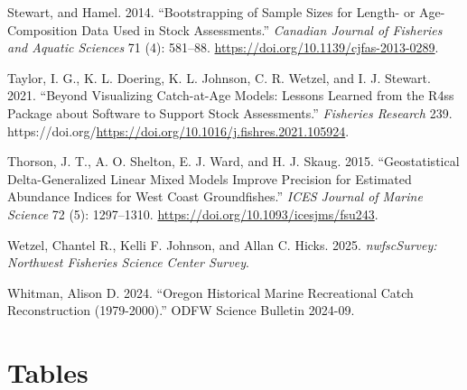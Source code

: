 \documentclass[
]{scrartcl}
\newlength{\cslhangindent}
\newenvironment{CSLReferences}[2] %
 {\begin{list}{}{%
  \setlength{\itemindent}{0pt}
  \setlength{\leftmargin}{0pt}
  \setlength{\parsep}{0pt}
  \ifodd #1
   \setlength{\leftmargin}{\cslhangindent}
   \setlength{\itemindent}{-1\cslhangindent}
  \fi
  \setlength{\itemsep}{#2\baselineskip}}}
 {\end{list}}
\begin{document}
\begin{CSLReferences}{1}{0}
Stewart, and Hamel. 2014. {``Bootstrapping of Sample Sizes for Length-
or Age-Composition Data Used in Stock Assessments.''} \emph{Canadian
Journal of Fisheries and Aquatic Sciences} 71 (4): 581--88.
\url{https://doi.org/10.1139/cjfas-2013-0289}.

Taylor, I. G., K. L. Doering, K. L. Johnson, C. R. Wetzel, and I. J.
Stewart. 2021. {``Beyond Visualizing Catch-at-Age Models: Lessons
Learned from the R4ss Package about Software to Support Stock
Assessments.''} \emph{Fisheries Research} 239.
https://doi.org/\url{https://doi.org/10.1016/j.fishres.2021.105924}.

Thorson, J. T., A. O. Shelton, E. J. Ward, and H. J. Skaug. 2015.
{``Geostatistical Delta-Generalized Linear Mixed Models Improve
Precision for Estimated Abundance Indices for {West} {Coast}
Groundfishes.''} \emph{ICES Journal of Marine Science} 72 (5):
1297--1310. \url{https://doi.org/10.1093/icesjms/fsu243}.

Wetzel, Chantel R., Kelli F. Johnson, and Allan C. Hicks. 2025.
\emph{nwfscSurvey: Northwest Fisheries Science Center Survey}.

Whitman, Alison D. 2024. {``Oregon Historical Marine Recreational Catch
Reconstruction (1979-2000).''} ODFW Science Bulletin 2024-09.

\end{CSLReferences}

\newpage{}

\section{Tables}\label{tables}

\begingroup
\fontsize{9.0pt}{10.8pt}\selectfont
\end{document}
